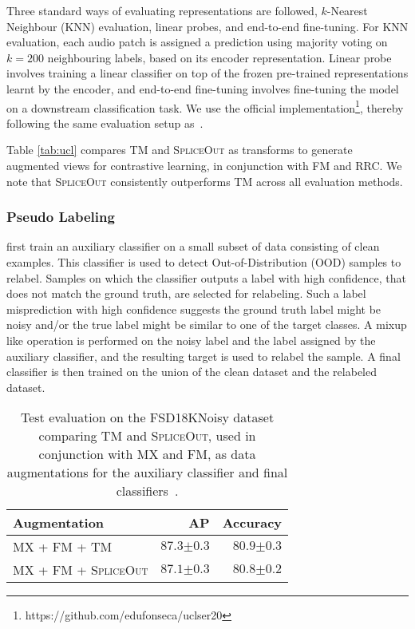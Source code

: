 \documentclass{article}
\newcommand{\SpA}{{\textsc{SpliceOut}}\xspace}
\begin{document}
Three standard ways of evaluating representations are followed, $k$-Nearest Neighbour (KNN) evaluation, linear probes, and end-to-end fine-tuning. For KNN evaluation, each audio patch is assigned a prediction using majority voting on $k=200$ neighbouring labels, based on its encoder representation. Linear probe involves training a linear classifier on top of the frozen pre-trained representations learnt by the encoder, and end-to-end fine-tuning involves fine-tuning the model on a downstream classification task. We use the official implementation\footnote{https://github.com/edufonseca/uclser20}, thereby following the same evaluation setup as~\citep{ucl}. 

Table \ref{tab:ucl} compares TM and \SpA as transforms to generate augmented views for contrastive learning, in conjunction with FM and RRC. We note that \SpA consistently outperforms TM across all evaluation methods.  

\subsubsection{Pseudo Labeling}
\citep{ood} first train an auxiliary classifier on a small subset of data consisting of clean examples. This classifier is used to detect Out-of-Distribution (OOD) samples to relabel. Samples on which the classifier outputs a label with high confidence, that does not match the ground truth, are selected for relabeling. Such a label misprediction with high confidence  suggests the ground truth label might be noisy and/or the true label might be similar to one of the target classes. A mixup like operation is performed on the noisy label and the label assigned by the auxiliary classifier, and the resulting target is used to relabel the sample. A final classifier is then trained on the union of the clean dataset and the relabeled dataset. 

\begin{table}[h]
    \centering
    \caption{Test evaluation on the FSD18KNoisy dataset comparing TM and \SpA, used in conjunction with MX and FM, as data augmentations for the auxiliary classifier and final classifiers~\citep{ood}.}
    \begin{tabular}{lrr}
    \toprule
     Augmentation & AP & Accuracy\\
     \midrule
    MX + FM + TM~\citep{ood} & $87.3{\scriptstyle \pm 0.3}$ & $80.9{\scriptstyle \pm 0.3}$\\
    MX + FM + \SpA & $87.1{\scriptstyle \pm 0.3}$ & $80.8{\scriptstyle \pm 0.2}$\\
    \bottomrule
    \end{tabular}
    \label{tab:pseudolbl}
\end{table}
\end{document}
